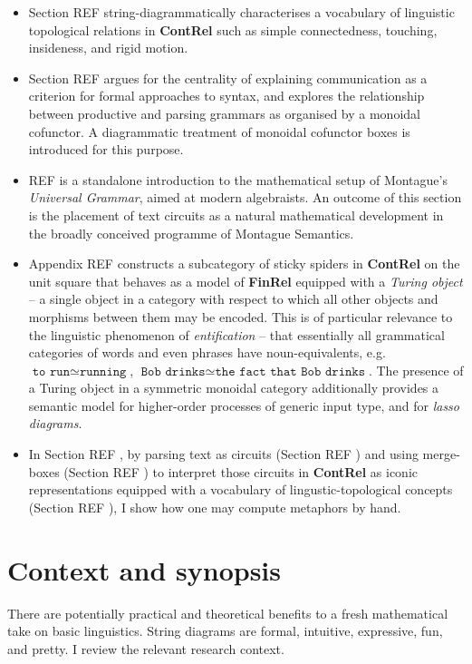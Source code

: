 \begin{myboxB}
\begin{itemize}
\item Section \bR REF \e string-diagrammatically characterises a vocabulary of linguistic topological relations in \textbf{ContRel} such as simple connectedness, touching, insideness, and rigid motion.

\item Section \bR REF \e argues for the centrality of explaining communication as a criterion for formal approaches to syntax, and explores the relationship between productive and parsing grammars as organised by a monoidal cofunctor. A diagrammatic treatment of monoidal cofunctor boxes is introduced for this purpose.

\item \bR REF \e is a standalone introduction to the mathematical setup of Montague's \emph{Universal Grammar}, aimed at modern algebraists. An outcome of this section is the placement of text circuits as a natural mathematical development in the broadly conceived programme of Montague Semantics.

\item Appendix \bR REF \e constructs a subcategory of sticky spiders in \textbf{ContRel} on the unit square that behaves as a model of \textbf{FinRel} equipped with a \emph{Turing object} -- a single object in a category with respect to which all other objects and morphisms between them may be encoded. This is of particular relevance to the linguistic phenomenon of \emph{entification} -- that essentially all grammatical categories of words and even phrases have noun-equivalents, e.g. $\texttt{to run} \simeq \texttt{running}$, $\texttt{Bob drinks} \simeq \texttt{the fact that Bob drinks}$. The presence of a Turing object in a symmetric monoidal category additionally provides a semantic model for higher-order processes of generic input type, and for \emph{lasso diagrams}.

\item In Section \bR REF \e, by parsing text as circuits (Section \bR REF \e) and using merge-boxes (Section \bR REF \e) to interpret those circuits in \textbf{ContRel} as iconic representations equipped with a vocabulary of lingustic-topological concepts (Section \bR REF \e), I show how one may compute metaphors by hand.

\end{itemize}
\end{myboxB}
\vfill
\clearpage
\newpage

\setcounter{chapter}{-1}
\chapter{Context and synopsis}
There are potentially practical and theoretical benefits to a fresh mathematical take on basic linguistics. String diagrams are formal, intuitive, expressive, fun, and pretty. I review the relevant research context.
\newpage

\newpage
\label{sec:proctheory}
\newpage


